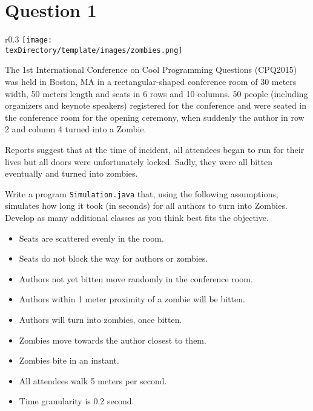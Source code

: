\documentclass[12pt,letterpaper,twoside]{article}
\begin{document}


\section*{Question 1}

\begin{wrapfigure}{r}{0.3\textwidth}
\centering
\texttt{[image: \\texDirectory/template/images/zombies.png]}
\end{wrapfigure}

The 1st International Conference on Cool Programming Questions (CPQ2015) was held in Boston, MA in a rectangular-shaped conference room of 30 meters width, 50 meters length and seats in 6 rows and 10 columns. 50 people (including organizers and keynote speakers) registered for the conference and were seated in the conference room for the opening ceremony, when suddenly the author in row 2 and column 4 turned into a Zombie.

Reports suggest that at the time of incident, all attendees began to run for their lives but all doors were unfortunately locked. Sadly, they were all bitten eventually and turned into zombies.

Write a program \texttt{Simulation.java} that, using the following assumptions, simulates how long it took (in seconds) for all authors to turn into Zombies. Develop as many additional classes as you think best fits the objective.

\begin{itemize}[itemsep=1mm]\parskip=0pt
\item[] Seats are scattered evenly in the room.
\item[] Seats do not block the way for authors or zombies.
\item[] Authors not yet bitten move randomly in the conference room.
\item[] Authors within 1 meter proximity of a zombie will be bitten.
\item[] Authors will turn into zombies, once bitten.
\item[] Zombies move towards the author closest to them.
\item[] Zombies bite in an instant.
\item[] All attendees walk 5 meters per second.
\item[] Time granularity is 0.2 second.
\end{itemize}

\end{document}
